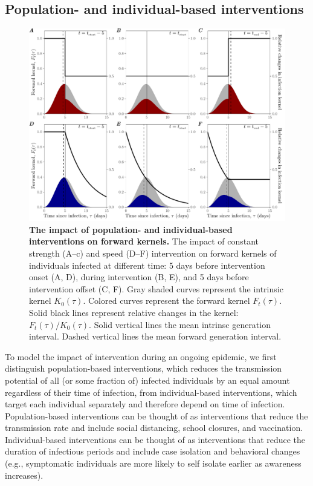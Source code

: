 \documentclass[12pt]{article}
\begin{document}
\subsection{Population- and individual-based interventions}

\begin{figure}[!th]
\includegraphics[width=1\textwidth]{pop_ind_compare.pdf}
\caption{
\textbf{The impact of population- and individual-based interventions on forward kernels.}
The impact of constant strength (A--c) and speed (D--F) intervention on forward kernels of individuals infected at different time:
5 days before intervention onset (A, D), during intervention (B, E), and 5 days before intervention offset (C, F).
Gray shaded curves represent the intrinsic kernel $K_0(\tau)$.
Colored curves represent the forward kernel $F_t(\tau)$.
Solid black lines represent relative changes in the kernel: $F_t(\tau)/K_0(\tau)$.
Solid vertical lines the mean intrinsc generation interval.
Dashed vertical lines the mean forward generation interval.
}
\label{fig:indpop}
\end{figure}

To model the impact of intervention during an ongoing epidemic, we first distinguish population-based interventions, which reduces the transmission potential of all (or some fraction of) infected individuals by an equal amount regardless of their time of infection, from individual-based interventions, which target each individual separately and therefore depend on time of infection.
Population-based interventions can be thought of as interventions that reduce the transmission rate and include social distancing, school closures, and vaccination.
Individual-based interventions can be thought of as interventions that reduce the duration of infectious periods and include case isolation and behavioral changes (e.g., symptomatic individuals are more likely to self isolate earlier as awareness increases).
\end{document}
